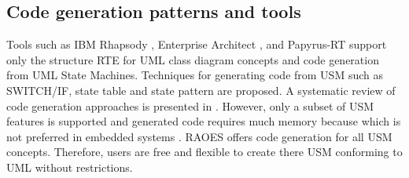 \subsection{Code generation patterns and tools}
Tools such as IBM Rhapsody \cite{ibm_rhapsody}, Enterprise Architect \cite{EA}, and Papyrus-RT \cite{possepapyrusrt} support only the structure RTE for UML class diagram concepts and code generation from UML State Machines.
Techniques for generating code from USM such as SWITCH/IF, state table \cite{Douglass1999} and state pattern \cite{Shalyto2006,niaz_mapping_2004} are proposed. 
A systematic review of code generation approaches is presented in \cite{Domnguez2012}.
However, only a subset of USM features is supported and generated code requires much memory because %
which is not preferred in embedded systems \cite{spinke_object-oriented_2013}.
RAOES offers code generation for all USM concepts. %
Therefore, users are free and flexible to create there USM conforming to UML without restrictions.